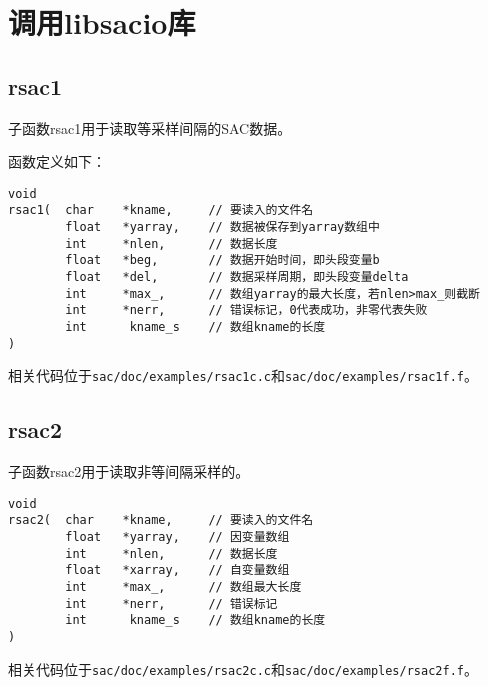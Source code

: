 \section{调用libsacio库}
\subsection{rsac1}
子函数rsac1用于读取等采样间隔的SAC数据。

函数定义如下：
\begin{lstlisting}[style=C]
void                                                                                
rsac1(  char    *kname,     // 要读入的文件名
        float   *yarray,    // 数据被保存到yarray数组中                                               
        int     *nlen,      // 数据长度                             
        float   *beg,       // 数据开始时间，即头段变量b                                             
        float   *del,       // 数据采样周期，即头段变量delta
        int     *max_,      // 数组yarray的最大长度，若nlen>max_则截断                        
        int     *nerr,      // 错误标记，0代表成功，非零代表失败              
        int      kname_s    // 数组kname的长度
)
\end{lstlisting}

相关代码位于\lstinline{sac/doc/examples/rsac1c.c}和\lstinline{sac/doc/examples/rsac1f.f}。

\subsection{rsac2}
子函数rsac2用于读取非等间隔采样的。
\begin{lstlisting}[style=C]
void 
rsac2(  char    *kname,     // 要读入的文件名                                                         
        float   *yarray,    // 因变量数组                                       
        int     *nlen,      // 数据长度                                           
        float   *xarray,    // 自变量数组
        int     *max_,      // 数组最大长度                                             
        int     *nerr,      // 错误标记                                         
        int      kname_s    // 数组kname的长度
)
\end{lstlisting}
相关代码位于\lstinline{sac/doc/examples/rsac2c.c}和\lstinline{sac/doc/examples/rsac2f.f}。

